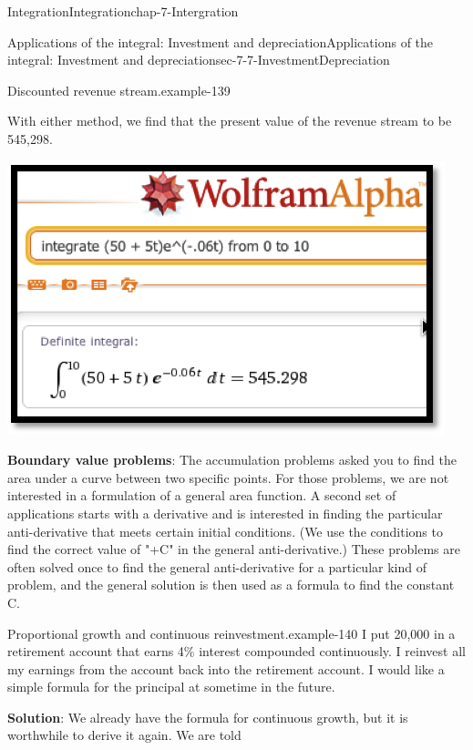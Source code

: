 \documentclass[oneside,10pt,]{book}
\newcommand{\terminology}[1]{\textbf{#1}}
\numberwithin{equation}{section}
\begin{document}
\begin{chapterptx}{Integration}{}{Integration}{}{}{chap-7-Intergration}
\begin{sectionptx}{Applications of the integral: Investment and depreciation}{}{Applications of the integral: Investment and depreciation}{}{}{sec-7-7-InvestmentDepreciation}
\begin{example}{Discounted revenue stream.}{example-139}
\begin{sidebyside}{1}{0.1}{0.1}{0}
\begin{sbspanel}{0.8}
\end{sbspanel}%
\end{sidebyside}%
\par
\hypertarget{p-3018}{}%
With either method, we find that the present value of the revenue stream to be \textdollar{}545,298.%
\begin{sidebyside}{1}{0.25}{0.25}{0}%
\begin{sbspanel}{0.5}%
\includegraphics[width=1\linewidth]{images/sec7-7-5.png}
\end{sbspanel}%
\end{sidebyside}%
\end{example}
\hypertarget{p-3019}{}%
\terminology{Boundary value problems}: The accumulation problems asked you to find the area under a curve between two specific points.  For those problems, we are not interested in a formulation of a general area function.  A second set of applications starts with a derivative and is interested in finding the particular anti-derivative that meets certain initial conditions.  (We use the conditions to find the correct value of "+C" in the general anti-derivative.)  These problems are often solved once to find the general anti-derivative for a particular kind of problem, and the general solution is then used as a formula to find the constant C.%
\begin{example}{Proportional growth and continuous reinvestment.}{example-140}%
\hypertarget{p-3020}{}%
I put \textdollar{}20,000 in a retirement account that earns 4\% interest compounded continuously.  I reinvest all my earnings from the account back into the retirement account.   I would like a simple formula for the principal at sometime in the future.%
\par
\hypertarget{p-3021}{}%
\terminology{Solution}: We already have the formula for continuous growth, but it is worthwhile to derive it again.  We are told%

\end{example}
\end{sectionptx}
\end{chapterptx}
\end{document}
